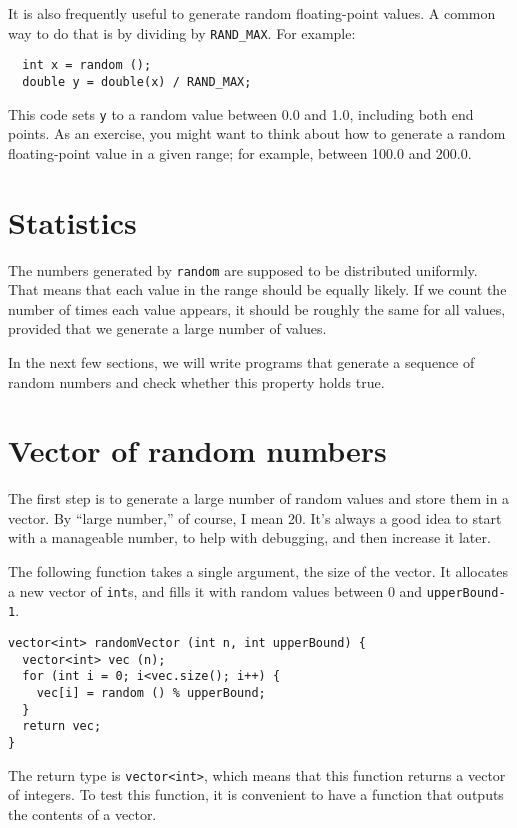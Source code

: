 It is also frequently useful to generate random floating-point values.
A common way to do that is by dividing by {\tt RAND\_MAX}.  For
example:

\begin{verbatim}
  int x = random ();
  double y = double(x) / RAND_MAX;
\end{verbatim}
%
This code sets {\tt y} to a random value between 0.0 and 1.0,
including both end points.  As an exercise, you might want to
think about how to generate a random floating-point value in
a given range; for example, between 100.0 and 200.0.

\section{Statistics}

The numbers generated by {\tt random} are supposed to be distributed
uniformly.  That means that each value in the range should be
equally likely.  If we count the number of times each value appears,
it should be roughly the same for all values, provided that we
generate a large number of values.

In the next few sections, we will write programs that generate
a sequence of random numbers and check whether this property
holds true.

\section{Vector of random numbers}

The first step is to generate a large number of random values
and store them in a vector.  By ``large number,'' of course,
I mean 20.  It's always a good idea to start with a manageable
number, to help with debugging, and then increase it later.

The following function takes a single argument, the size of
the vector.  It allocates a new vector of {\tt int}s, 
and fills it with random values between 0 and {\tt upperBound-1}.

\begin{verbatim}
vector<int> randomVector (int n, int upperBound) {
  vector<int> vec (n);
  for (int i = 0; i<vec.size(); i++) {
    vec[i] = random () % upperBound;
  }
  return vec;
}
\end{verbatim}
%
The return type is {\tt vector<int>}, which means that
this function returns a vector of integers.
To test this function, it is convenient to have a function that
outputs the contents of a vector.

